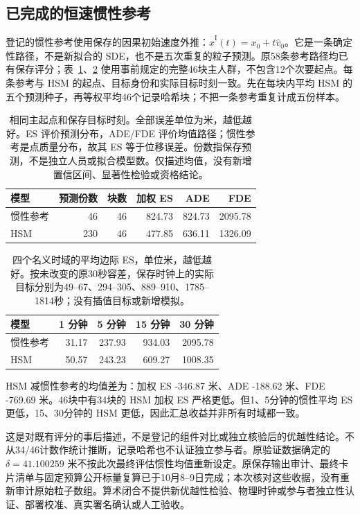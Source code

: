 \FloatBarrier
\subsection{已完成的恒速惯性参考}
\label{sec:inertial-primary}
登记的惯性参考使用保存的因果初始速度外推：$\widehat x^{\mathrm{I}}(t)=x_0+t\widehat v_0$。它是一条确定性路径，不是新拟合的 SDE，也不是五次重复的粒子预测。原58条参考路径均已有保存评分；表~\ref{tab:inertial-primary}、\ref{tab:inertial-horizons} 使用事前规定的完整46块主人群，不包含12个次要起点。每条参考与 HSM 的起点、目标身份和实际目标时刻一致。先在每块内平均 HSM 的五个预测种子，再等权平均46个记录哈希块；不把一条参考重复计成五份样本。

\begin{table}[htbp]\centering\small
\caption{相同主起点和保存目标时刻。全部误差单位为米，越低越好。ES 评价预测分布，ADE/FDE 评价均值路径；惯性参考是点质量分布，故其 ES 等于位移误差。份数指保存预测，不是独立人员或拟合模型数。仅描述均值，没有新增置信区间、显著性检验或资格结论。}\label{tab:inertial-primary}
\begin{tabular}{@{}lrrrrr@{}}\toprule
模型 & 预测份数 & 块数 & 加权 ES & ADE & FDE\\\midrule
惯性参考 & 46 & 46 & 824.73 & 824.73 & 2095.78\\
HSM & 230 & 46 & 477.85 & 636.11 & 1326.09\\
\bottomrule\end{tabular}\end{table}

\begin{table}[htbp]\centering\small
\caption{四个名义时域的平均边际 ES，单位米，越低越好。按未改变的原30秒容差，保存时钟上的实际目标分别为49--67、294--305、889--910、1785--1814秒；没有插值目标或新增模拟。}\label{tab:inertial-horizons}
\begin{tabular}{@{}lrrrr@{}}\toprule
模型 & 1 分钟 & 5 分钟 & 15 分钟 & 30 分钟\\\midrule
惯性参考 & 31.17 & 237.93 & 934.03 & 2095.78\\
HSM & 50.57 & 243.23 & 609.27 & 1008.35\\
\bottomrule\end{tabular}\end{table}

HSM 减惯性参考的均值差为：加权 ES -346.87 米、ADE -188.62 米、FDE -769.69 米。46块中有34块的 HSM 加权 ES 严格更低。但1、5分钟的惯性平均 ES 更低，15、30分钟的 HSM 更低，因此汇总收益并非所有时域都一致。

这是对既有评分的事后描述，不是登记的组件对比或独立核验后的优越性结论。不从34/46计数作统计推断，记录哈希也不认证独立参与者。原验证数据确定的 $\delta=41.100259$ 米不按此次最终评估惯性均值重新设定。原保存输出审计、最终卡片清单与固定预算公开标量复算已于10月8--9日完成；本次核对这些收据，没有重新审计原始粒子数组。算术闭合不提供新优越性检验、物理时钟或参与者独立性认证、部署校准、真实署名确认或人工验收。
\FloatBarrier
